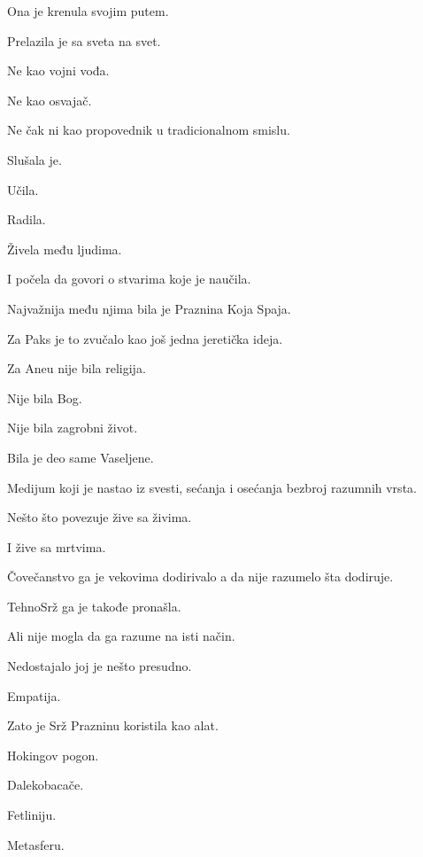 \bigskip

Ona je krenula svojim putem.

\bigskip

Prelazila je sa sveta na svet.

Ne kao vojni vođa.

Ne kao osvajač.

Ne čak ni kao propovednik u tradicionalnom smislu.

\bigskip

Slušala je.

Učila.

Radila.

Živela među ljudima.

\bigskip

I počela da govori o stvarima koje je naučila.

\bigskip

Najvažnija među njima bila je Praznina Koja Spaja.

\bigskip

Za Paks je to zvučalo kao još jedna jeretička ideja.

Za Aneu nije bila religija.

Nije bila Bog.

Nije bila zagrobni život.

\bigskip

Bila je deo same Vaseljene.

Medijum koji je nastao iz svesti, sećanja i osećanja bezbroj razumnih vrsta.

Nešto što povezuje žive sa živima.

I žive sa mrtvima.

\bigskip

Čovečanstvo ga je vekovima dodirivalo a da nije razumelo šta dodiruje.

\bigskip

TehnoSrž ga je takođe pronašla.

Ali nije mogla da ga razume na isti način.

\bigskip

Nedostajalo joj je nešto presudno.

Empatija.

\bigskip

Zato je Srž Prazninu koristila kao alat.

Hokingov pogon.

Dalekobacače.

Fetliniju.

Metasferu.

\bigskip

